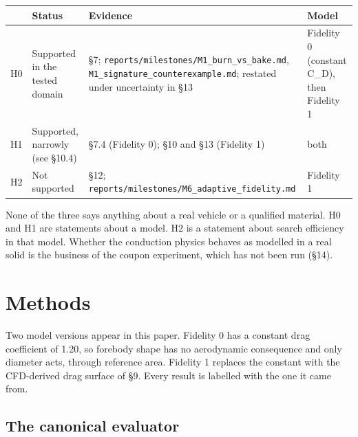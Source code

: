 \documentclass[
  a4paper,
  11pt]{article}
\newcommand{\tabhead}[1]{{\sffamily\bfseries\fontsize{8.5}{10.5}\selectfont #1}}
\begin{document}
\begin{center}
\small\centering
\begin{tabular}{@{}>{\raggedright\arraybackslash}p{}>{\raggedright\arraybackslash}p{}>{\raggedright\arraybackslash}p{}>{\raggedright\arraybackslash}p{}@{}}
\toprule
\tabhead{Hypothesis} & \tabhead{Status} & \tabhead{Evidence} & \tabhead{Model} \\
\midrule
H0 & Supported in the tested domain & §7;
\texttt{reports/\allowbreak{}milestones/\allowbreak{}M1\_\allowbreak{}burn\_\allowbreak{}vs\_\allowbreak{}bake.md},
\texttt{M1\_\allowbreak{}signature\_\allowbreak{}counterexample.md};
restated under uncertainty in §13 & Fidelity 0 (constant C\_D), then Fidelity 1 \\
H1 & Supported, narrowly (see §10.4) & §7.4 (Fidelity 0); §10 and §13 (Fidelity 1) & both \\
H2 & Not supported & §12;
\texttt{reports/\allowbreak{}milestones/\allowbreak{}M6\_\allowbreak{}adaptive\_\allowbreak{}fidelity.md} & Fidelity 1 \\
\bottomrule
\end{tabular}
\end{center}

None of the three says anything about a real vehicle or a qualified
material. H0 and H1 are statements about a model. H2 is a statement
about search efficiency in that model. Whether the conduction physics
behaves as modelled in a real solid is the business of the coupon
experiment, which has not been run (§14).

\section{Methods}

Two model versions appear in this paper. Fidelity 0 has a constant drag
coefficient of 1.20, so forebody shape has no aerodynamic consequence
and only diameter acts, through reference area. Fidelity 1 replaces the
constant with the CFD-derived drag surface of §9. Every result is
labelled with the one it came from.

\subsection{The canonical evaluator}
\end{document}
